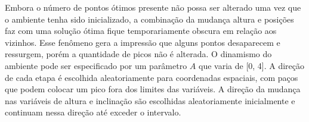 Embora o número de pontos ótimos presente não possa ser alterado uma vez que o ambiente tenha sido inicializado, a combinação da mudança altura e posições faz com uma solução ótima fique temporariamente obscura em relação aos vizinhos. Esse fenômeno gera a impressão que alguns pontos desaparecem e ressurgem, porém a quantidade de picos não é alterada. O dinamismo do ambiente pode ser especificado por um parâmetro $A$ que varia de [0, 4]. A direção de cada etapa é escolhida aleatoriamente para coordenadas espaciais, com paços que podem colocar um pico fora dos limites das variáveis. A direção da mudança nas variáveis de altura e inclinação são escolhidas aleatoriamente inicialmente e continuam nessa direção até exceder o intervalo.